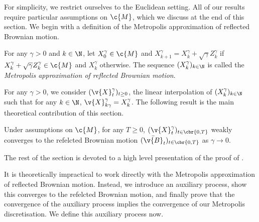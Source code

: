 For simplicity, we restrict ourselves to the Euclidean setting.
All of our results require particular assumptions on \(\c{M}\), which we discuss at the end of this section.
We begin with a definition of the Metropolis approximation of reflected Brownian motion.

\begin{definition}
	For any \(\gamma >0\) and \(k \in \N\), let \(X_0^\gamma \in \c{M}\) and \(X_{k+1}^\gamma = X_k^\gamma + \sqrt{\gamma} Z_k^\gamma\) if \(X_k^\gamma + \sqrt{\gamma} Z_k^\gamma \in \c{M}\) and \(X_k^\gamma\) otherwise.
	The sequence \((X_k^\gamma)_{k \in \N}\) is called the \emph{Metropolis approximation of reflected Brownian motion}.
\end{definition}
For any \(\gamma > 0\), we consider \((\v{X}_t^\gamma)_{t \geq 0}\), the linear interpolation of \((X^\gamma_k)_{k \in \N}\) such that for any \(k \in \N\), \(\v{X}_{k \gamma}^\gamma = X_k^\gamma\).
The following result is the main theoretical contribution of this section.

\begin{theorem}
	\label{thm:weak_convergence_metropolis}
	Under assumptions on \(\c{M}\), for any \(T \geq 0\), \((\v{X}_t^\gamma)_{t \in \cbr{0,T}}\) weakly converges to the refelcted Brownian motion \((\bar{\v{B}}_t)_{t \in \cbr{0,T}}\) as \(\gamma \to 0\).
\end{theorem}

The rest of the section is devoted to a high level presentation of the proof of .

It is theoretically impractical to work directly with the Metropolis approximation of reflected Brownian motion.
Instead, we introduce an auxiliary process, show this converges to the refelcted Brownian motion, and finally prove that the convergence of the auxiliary process implies the convergence of our Metropolis discretisation.
We define this auxiliary process now.

